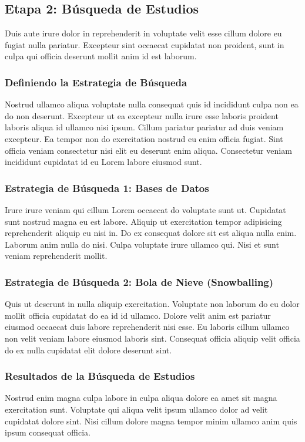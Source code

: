 \subsection{Etapa 2: Búsqueda de Estudios}
Duis aute irure dolor in reprehenderit in voluptate velit esse cillum dolore eu fugiat nulla pariatur. Excepteur sint occaecat cupidatat non proident, sunt in culpa qui officia deserunt mollit anim id est laborum.

\subsubsection{Definiendo la Estrategia de Búsqueda}
Nostrud ullamco aliqua voluptate nulla consequat quis id incididunt culpa non ea do non deserunt. Excepteur ut ea excepteur nulla irure esse laboris proident laboris aliqua id ullamco nisi ipsum. Cillum pariatur pariatur ad duis veniam excepteur. Ea tempor non do exercitation nostrud eu enim officia fugiat. Sint officia veniam consectetur nisi elit eu deserunt enim aliqua. Consectetur veniam incididunt cupidatat id eu Lorem labore eiusmod sunt.
\mbox{}\\


\subsubsection{Estrategia de Búsqueda 1: Bases de Datos}
Irure irure veniam qui cillum Lorem occaecat do voluptate sunt ut. Cupidatat sunt nostrud magna eu est labore. Aliquip ut exercitation tempor adipisicing reprehenderit aliquip eu nisi in. Do ex consequat dolore sit est aliqua nulla enim. Laborum anim nulla do nisi. Culpa voluptate irure ullamco qui. Nisi et sunt veniam reprehenderit mollit.
\mbox{}\\

\subsubsection{Estrategia de Búsqueda 2: Bola de Nieve (Snowballing)}
Quis ut deserunt in nulla aliquip exercitation. Voluptate non laborum do eu dolor mollit officia cupidatat do ea id id ullamco. Dolore velit anim est pariatur eiusmod occaecat duis labore reprehenderit nisi esse. Eu laboris cillum ullamco non velit veniam labore eiusmod laboris sint. Consequat officia aliquip velit officia do ex nulla cupidatat elit dolore deserunt sint.
\mbox{}\\

\subsubsection{Resultados de la Búsqueda de Estudios}
Nostrud enim magna culpa labore in culpa aliqua dolore ea amet sit magna exercitation sunt. Voluptate qui aliqua velit ipsum ullamco dolor ad velit cupidatat dolore sint. Nisi cillum dolore magna tempor minim ullamco anim quis ipsum consequat officia.
\mbox{}\\